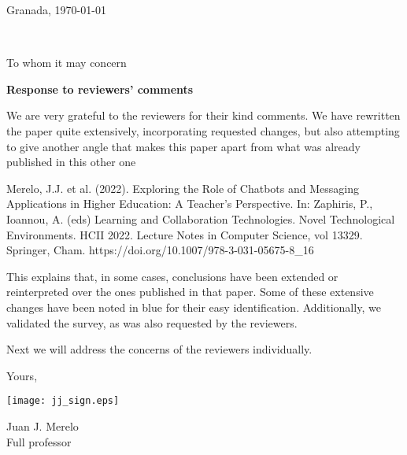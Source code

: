 \documentclass{letter}
\def\cabecera{


}
\begin{document}
\cabecera

\vspace{0.5cm}

\hspace{7cm}

\hfill Granada, \today

\vspace{0.5cm}
\ \
{
\begin{minipage}[t]{9cm}
To whom it may concern
\end{minipage}
 }

\vspace{0.5cm}



{\bf Response to reviewers' comments}

We are very grateful to the reviewers for their kind comments. We have rewritten
the paper quite extensively, incorporating requested changes, but also
attempting to give another angle that makes this paper apart from what was
already published in this other one

Merelo, J.J. et al. (2022). Exploring the Role of Chatbots and Messaging
Applications in Higher Education: A Teacher's Perspective. In: Zaphiris, P.,
Ioannou, A. (eds) Learning and Collaboration Technologies. Novel Technological
Environments. HCII 2022. Lecture Notes in Computer Science, vol 13329. Springer,
Cham. https://doi.org/10.1007/978-3-031-05675-8\_16

This explains that, in some cases, conclusions have been extended or
reinterpreted over the ones published in that paper. Some of these extensive
changes have been noted in blue for their easy identification.
Additionally, we validated
the survey, as was also requested by the reviewers.

Next we will address the concerns of the reviewers individually.


\hspace*{8cm} Yours,  \\

\centerline{\texttt{[image: jj\_sign.eps]}}

\hspace*{8cm} Juan J. Merelo\\
\hspace*{8cm} Full professor
\end{document}
